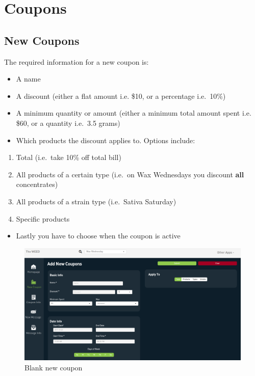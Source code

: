 \documentclass[]{book}
\providecommand{\tightlist}{%
  \setlength{\itemsep}{0pt}\setlength{\parskip}{0pt}}
\theoremstyle{definition}
\theoremstyle{definition}
\theoremstyle{definition}
\theoremstyle{remark}
\begin{document}
\section{Coupons}\label{coupons}

\subsection{New Coupons}\label{new-coupons}

The required information for a new coupon is:

\begin{itemize}
\item
  A name
\item
  A discount (either a flat amount i.e. \$10, or a percentage i.e.~10\%)
\item
  A minimum quantity or amount (either a minimum total amount spent i.e.
  \$60, or a quantity i.e.~3.5 grams)
\item
  Which products the discount applies to. Options include:
\end{itemize}

\begin{enumerate}
\def\labelenumi{\arabic{enumi}.}
\tightlist
\item
  Total (i.e.~take 10\% off total bill)
\item
  All products of a certain type (i.e.~on Wax Wednesdays you discount
  \textbf{all} concentrates)
\item
  All products of a strain type (i.e.~Sativa Saturday)
\item
  Specific products
\end{enumerate}

\begin{itemize}
\tightlist
\item
  Lastly you have to choose when the coupon is active
\end{itemize}

\begin{figure}
\centering
\includegraphics{images/C1.png}
\caption{Blank new coupon}
\end{figure}
\end{document}
